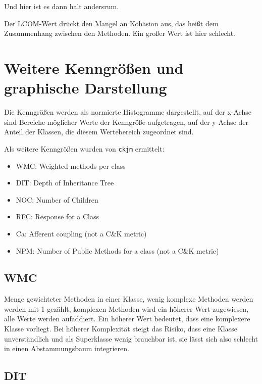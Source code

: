 \documentclass{scrreprt}
\newcommand{\lstx}[1]{\lstinline$#1$}
\begin{document}
Und hier ist es dann halt andersrum.

Der LCOM-Wert drückt den Mangel an Kohäsion aus, das heißt dem Zusammenhang zwischen den Methoden. Ein großer Wert ist hier schlecht.

\section{Weitere Kenngrößen und graphische Darstellung}


Die Kenngrößen werden als normierte Histogramme dargestellt, auf der x-Achse sind Bereiche möglicher Werte der Kenngröße aufgetragen, auf der y-Achse der Anteil der Klassen, die diesem Wertebereich zugeordnet sind.

Als weitere Kenngrößen wurden von \lstx{ckjm} ermittelt:

\begin{itemize}
\item WMC: Weighted methods per class
\item DIT: Depth of Inheritance Tree
\item NOC: Number of Children
\item RFC: Response for a Class
\item Ca: Afferent coupling (not a C\&K metric)
\item NPM: Number of Public Methods for a class (not a C\&K metric)
\end{itemize}

\subsection{WMC}

Menge gewichteter Methoden in einer Klasse, wenig komplexe Methoden werden werden mit 1 gezählt, komplexen Methoden wird ein höherer Wert zugewiesen, alle Werte werden aufaddiert. Ein höherer Wert bedeutet, dass eine komplexere Klasse vorliegt. Bei höherer Komplexität steigt das Risiko, dass eine Klasse unverständlich und als Superklasse wenig brauchbar ist, sie lässt sich also schlecht in einen Abstammungsbaum integrieren.


\subsection{DIT}
\end{document}
